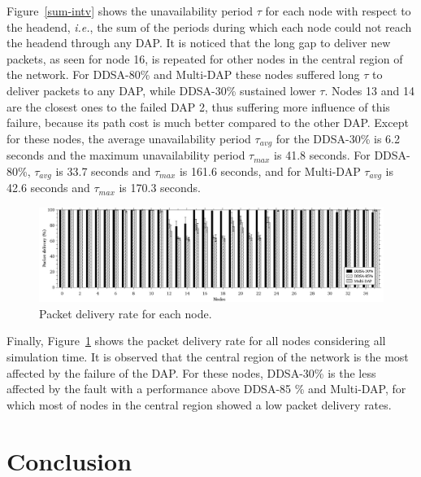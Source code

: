\documentclass[conference]{IEEEtran}
\begin{document}
Figure~\ref{sum-intv} shows the unavailability period $\tau$ for each node with respect to the headend,\textit{ i.e.}, the sum of the periods during which each node could not reach the headend through any DAP. 
 It is noticed that the long gap to deliver new packets, as seen for node 16, is repeated for other nodes in the central region of the network. For DDSA-80\% and Multi-DAP these nodes suffered long $\tau$ to deliver packets to any DAP, while DDSA-30\% sustained lower $\tau$. 
Nodes 13 and 14 are the closest ones to the failed DAP 2, thus suffering more influence of this failure, because its path cost is much better compared to the other DAP. Except for these nodes, the average unavailability period $\tau_{avg}$ for the DDSA-30\% is 6.2 seconds and the maximum unavailability period $\tau_{max}$ is 41.8 seconds. For DDSA-80\%, $\tau_{avg}$ is 33.7 seconds and $\tau_{max}$ is 161.6 seconds, and for Multi-DAP $\tau_{avg}$ is 42.6 seconds and $\tau_{max}$ is 170.3 seconds. 





\begin{figure}[ht]
  \centering
  \mbox{
    {\includegraphics[scale=.155]{IEEE-consolidados/G-no-pdf-app.jpg}}}
  \caption{Packet delivery rate for each node.}
  \label{pdf-node}
\end{figure}


Finally, Figure~\ref{pdf-node} shows the packet delivery rate for all nodes considering all simulation time. It is observed that the central region of the network is the most affected by the failure of the DAP. For these nodes, DDSA-30\% is the less affected by the fault with a performance above DDSA-85 \% and Multi-DAP, for which most of nodes in the central region showed a low packet delivery rates.

\section{Conclusion}
\end{document}
